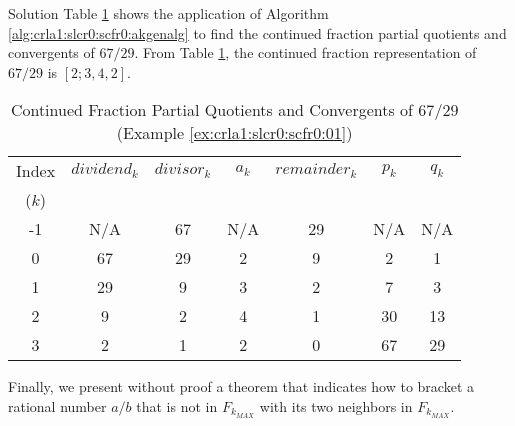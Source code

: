 \begin{vworkexampleparsection}{Solution} Table 
\ref{tbl:crla1:slcr0:scfr0:01} shows the application of 
Algorithm \ref{alg:crla1:slcr0:scfr0:akgenalg} to find the
continued fraction partial quotients and convergents of $67/29$.  From
Table \ref{tbl:crla1:slcr0:scfr0:01}, the continued fraction
representation of $67/29$ is $[2;3,4,2]$.

\begin{table}
\caption{Continued Fraction Partial Quotients and Convergents of $67/29$ (Example \ref{ex:crla1:slcr0:scfr0:01})}
\label{tbl:crla1:slcr0:scfr0:01}
\begin{center}
\begin{tabular}{|c|c|c|c|c|c|c|}
\hline
\small{Index} & \small{$dividend_k$}  & \small{$divisor_k$} & \small{$a_k$}   & \small{$remainder_k$} & \small{$p_k$} & \small{$q_k$} \\
\small{($k$)} &                       &                     &                 &                       &               &               \\
\hline
\hline
\small{-1}    & \small{N/A}           & \small{67}          & \small{N/A}     & \small{29}            & \small{N/A}   & \small{N/A}   \\
\hline
\small{0}     & \small{67}            & \small{29}          & \small{2}       & \small{9}             & \small{2}     & \small{1}     \\
\hline
\small{1}     & \small{29}            & \small{9}           & \small{3}       & \small{2}             & \small{7}     & \small{3}     \\
\hline
\small{2}     & \small{9}             & \small{2}           & \small{4}       & \small{1}             & \small{30}    & \small{13}    \\
\hline
\small{3}     & \small{2}             & \small{1}           & \small{2}       & \small{0}             & \small{67}    & \small{29}    \\
\hline
\end{tabular}
\end{center}
\end{table}
\end{vworkexampleparsection}
\vworkexamplefooter{}

Finally, we present without proof a theorem that indicates how to bracket
a rational number $a/b$ that is not in $F_{k_{MAX}}$ with its two neighbors
in $F_{k_{MAX}}$.

